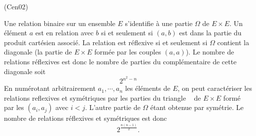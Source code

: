\begin{tiny}(Cen02)\end{tiny} Une relation binaire sur un ensemble $E$ s'identifie à une partie $\Omega$ de $E\times E$. Un élément $a$ est en relation avec $b$ si et seulement si $(a,b)$ est dans la partie du produit cartésien associé.\newline
La relation est réflexive si et seulement si $\Omega$ contient la diagonale (la partie de $E\times E$ formée par les couples $(a,a)$). Le nombre de relations réflexives est donc le nombre de parties du complémentaire de cette diagonale soit
\begin{displaymath}
  2^{n^2 - n}
\end{displaymath}
En numérotant arbitrairement $a_1,\cdots,a_n$ les éléments de $E$, on peut caractériser les relations reflexives et symétriques par les parties du \og triangle \fg~ de $E\times E$ formé par les $(a_i,a_j)$ avec $i<j$. L'autre partie de $\Omega$ étant obtenue par symétrie. Le nombre de relations réflexives et symétriques est donc
\begin{displaymath}
  2^{\frac{n(n-1)}{2}}.
\end{displaymath}

